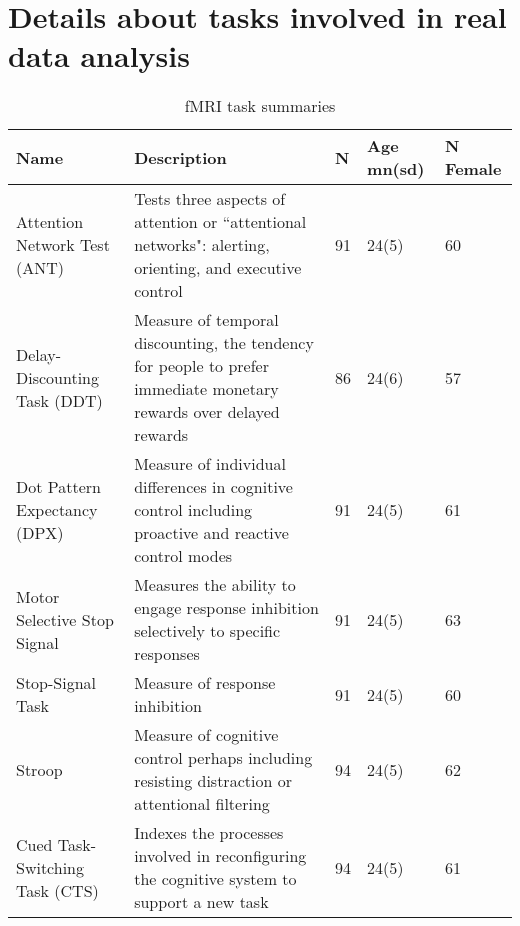 \documentclass[sn-mathphys,Numbered, super]{sn-jnl}
\newcommand{\beginsupplement}{%
        \setcounter{table}{0}
        \renewcommand{\thetable}{S\arabic{table}}%
        \setcounter{figure}{0}
        \renewcommand{\thefigure}{S\arabic{figure}}%
     }
\begin{document}




\tableofcontents
\newpage 



\section{Details about tasks involved in real data analysis}

\begin{table}[h!bt]
    \caption{fMRI task summaries}
    \label{tab:task_summaries}
    \begin{tabular}{L{4cm}L{5cm}L{1cm}L{1cm}L{1cm}}
   \toprule
   \textbf{Name} & \textbf{Description} & \textbf{N} & \textbf{Age mn(sd)} & \textbf{N Female} \\ 
   \midrule
   Attention Network Test (ANT) &  Tests three aspects of attention or  ``attentional networks": alerting, orienting, and executive control & 91 & 24(5) & 60\\ 
    Delay-Discounting Task (DDT) & Measure of temporal discounting, the tendency for people to prefer immediate monetary rewards over delayed rewards & 86 & 24(6) & 57\\ 
   Dot Pattern Expectancy (DPX) & Measure of individual differences in cognitive control including proactive and reactive control modes & 91 & 24(5) & 61\\ 
   Motor Selective Stop Signal & Measures the ability to engage response inhibition selectively to specific responses & 91 & 24(5) & 63 \\ 
   Stop-Signal Task & Measure of response inhibition & 91 & 24(5) & 60 \\ 
   Stroop & Measure of cognitive control perhaps including resisting distraction or attentional filtering & 94 & 24(5) & 62 \\ 
   Cued Task-Switching Task (CTS) & Indexes the processes involved in reconfiguring the cognitive system to support a new task & 94 & 24(5) & 61\\
    \end{tabular}
 \end{table}
\end{document}
